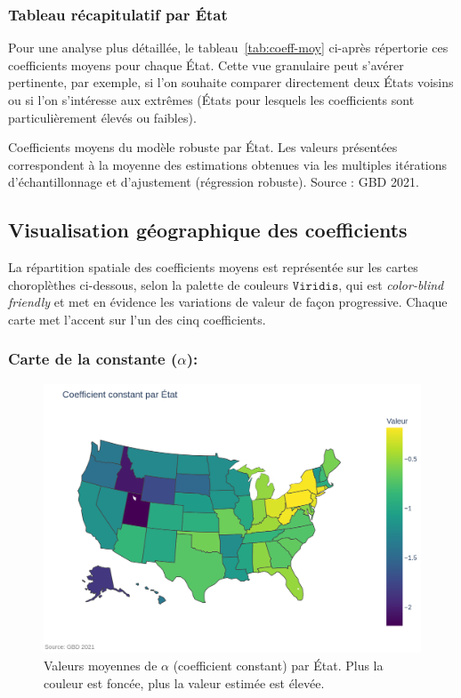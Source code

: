 \subsubsection*{Tableau récapitulatif par État}
Pour une analyse plus détaillée, le tableau~\ref{tab:coeff-moy} ci-après répertorie ces coefficients moyens pour chaque État. Cette vue granulaire peut s'avérer pertinente, par exemple, si l'on souhaite comparer directement deux États voisins ou si l'on s'intéresse aux extrêmes (États pour lesquels les coefficients sont particulièrement élevés ou faibles).

\begin{table}[H]
	\centering
	\caption{Coefficients moyens du modèle robuste par État. Les valeurs présentées correspondent à la moyenne des estimations obtenues via les multiples itérations d'échantillonnage et d'ajustement (régression robuste). Source : GBD 2021.}
	\label{tab:coeff-moy}
	\scalebox{0.85}{}
\end{table}

\subsection{Visualisation géographique des coefficients}
La répartition spatiale des coefficients moyens est représentée sur les cartes choroplèthes ci-dessous, selon la palette de couleurs \(\texttt{Viridis}\), qui est \emph{color-blind friendly} et met en évidence les variations de valeur de façon progressive. Chaque carte met l'accent sur l'un des cinq coefficients. 

\vspace{1em}
\subsubsection{Carte de la constante (\(\alpha\)):}

\begin{figure}[H]
	\centering
	\includegraphics[width=1\textwidth]{images/map_const.png}
	\caption{Valeurs moyennes de \(\alpha\) (coefficient constant) par État. 
		Plus la couleur est foncée, plus la valeur estimée est élevée.}
\end{figure}


